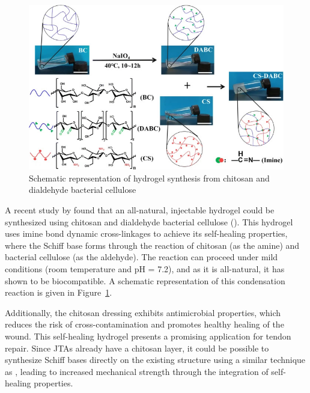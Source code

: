 \begin{figure}[hb]
    \centering 
    \includegraphics[width=0.7\linewidth]{Figures/CS_DABC_condensation.jpg}
    \caption{Schematic representation of hydrogel synthesis from chitosan and dialdehyde bacterial cellulose \autocite{liAllnaturalInjectableHydrogel2020}}
    \label{fig:CS_DABC_condensation}
\end{figure}

A recent study by \citeauthor{liAllnaturalInjectableHydrogel2020} found that an all-natural, injectable hydrogel could be synthesized using chitosan and dialdehyde bacterial cellulose (\citeyear{liAllnaturalInjectableHydrogel2020}). This hydrogel uses imine bond dynamic cross-linkages to achieve its self-healing properties, where the Schiff base forms through the reaction of chitosan (as the amine) and bacterial cellulose (as the aldehyde).
The reaction can proceed under mild conditions (room temperature and pH = 7.2), and as it is all-natural, it has shown to be biocompatible. A schematic representation of this condensation reaction is given in Figure~\ref{fig:CS_DABC_condensation}.

Additionally, the chitosan dressing exhibits antimicrobial properties, which reduces the risk of cross-contamination and promotes healthy healing of the wound.
This self-healing hydrogel presents a promising application for tendon repair. Since JTAs already have a chitosan layer, it could be possible to synthesize Schiff bases directly on the existing structure using a similar technique as \citeauthor{liAllnaturalInjectableHydrogel2020}, leading to increased mechanical strength through the integration of self-healing properties.
